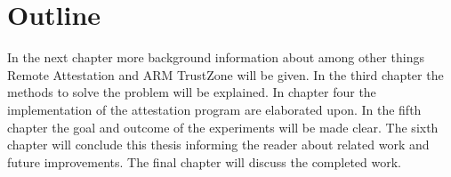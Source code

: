 \documentclass{report}
\begin{document}
\section{Outline}

In the next chapter more background information about among other things Remote Attestation and ARM TrustZone will be given. In the third chapter the methods to solve the problem will be explained. In chapter four the implementation of the attestation program are elaborated upon. In the fifth chapter the goal and outcome of the experiments will be made clear. The sixth chapter will conclude this thesis informing the reader about related work and future improvements. The final chapter will discuss the completed work.
\end{document}
